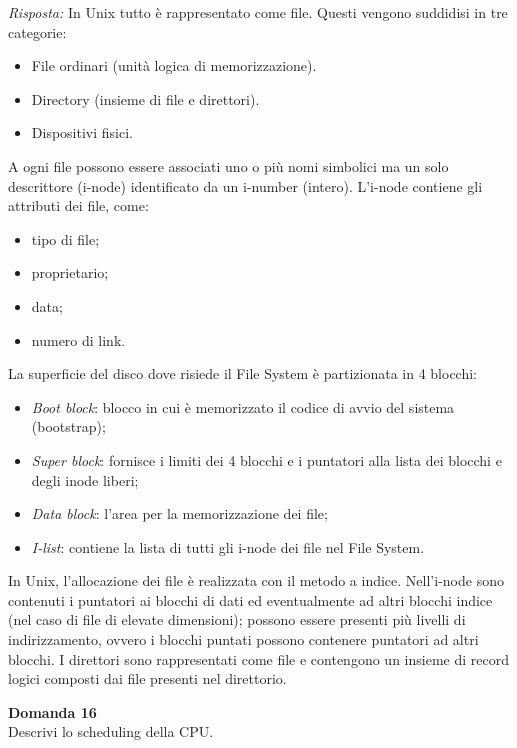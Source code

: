 \documentclass{article}
\newenvironment{problem}[2][Domanda]
    { \begin{mdframed}[backgroundcolor=gray!20] \textbf{#1 #2} \\}
    {  \end{mdframed}}
\newenvironment{solution}
    {\textit{Risposta:}}
    {}
\begin{document}
\begin{solution}
In Unix tutto è rappresentato come file.
\newline
Questi vengono suddidisi in tre categorie: 
\begin{itemize}
    \item File ordinari (unità logica di memorizzazione).
    \item Directory (insieme di file e direttori).
    \item Dispositivi fisici.
\end{itemize}
A ogni file possono essere associati uno o più nomi simbolici ma un solo descrittore (i-node) identificato da un i-number (intero).
\newline
L’i-node contiene gli attributi dei file, come:
\begin{itemize}
    \item tipo di file;
    \item proprietario;
    \item data;
    \item numero di link.
\end{itemize}
La superficie del disco dove risiede il File System è partizionata in 4 blocchi:
\begin{itemize}
    \item \emph{Boot block}: blocco in cui è memorizzato il codice di avvio del sistema (bootstrap);
    \item \emph{Super block}: fornisce i limiti dei 4 blocchi e i puntatori alla lista dei blocchi e degli inode liberi;
    \item \emph{Data block}: l’area per la memorizzazione dei file;
    \item \emph{I-list}: contiene la lista di tutti gli i-node dei file nel File System. 
\end{itemize}
In Unix, l’allocazione dei file è realizzata con il metodo a indice.
\newline
Nell’i-node sono contenuti i puntatori ai blocchi di dati ed eventualmente ad altri blocchi indice (nel caso di file di elevate dimensioni); possono essere presenti più livelli di indirizzamento, ovvero i blocchi puntati possono contenere puntatori ad altri blocchi.
\newline
I direttori sono rappresentati come file e contengono un insieme di record logici composti dai file presenti nel direttorio.
\end{solution}
\begin{problem}{16}
Descrivi lo scheduling della CPU.
\end{problem}
\end{document}
